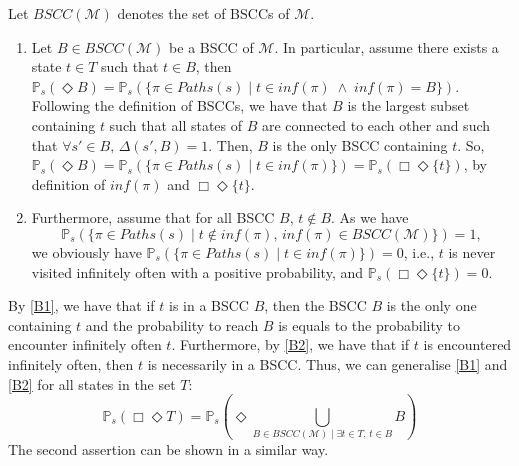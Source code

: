 \begin{proof2}
Let $BSCC(\mathcal{M})$ denotes the set of BSCCs of $\mathcal{M}$.
\begin{enumerate}
\item
Let $B \in BSCC(\mathcal{M})$ be a BSCC of $\mathcal{M}$.
In particular, assume there exists a state $t \in T$ such that $t \in B$, then $\mathbb{P}_s(\Diamond B) = \mathbb{P}_s(\{ \pi \in Paths(s) \; | \; t \in inf(\pi) \; \wedge \; inf(\pi) = B \})$. Following the definition of BSCCs, we have that $B$ is the largest subset containing $t$ such that all states of $B$ are connected to each other and such that $\forall s' \in B, \, \Delta(s', B)=1$. Then, $B$ is the only BSCC containing $t$. So,
$\mathbb{P}_s(\Diamond B) = \mathbb{P}_s(\{ \pi \in Paths(s) \; | \; t \in inf(\pi)\}) = \mathbb{P}_s(\Box \Diamond \{t\})$,
by definition of $inf(\pi)$ and $\Box\Diamond \{t\}$.
\label{B1}
\item
Furthermore, assume that for all BSCC $B$, $t \notin B$. As we have \[\mathbb{P}_s(\{\pi \in Paths(s)\; | \; t \notin inf(\pi), \, inf(\pi) \in BSCC(\mathcal{M})\}) = 1,\]
we obviously have $\mathbb{P}_s(\{\pi \in Paths(s)\; | \; t \in inf(\pi)\}) = 0$, i.e., $t$ is never visited infinitely often with a positive probability, and $\mathbb{P}_s(\Box\Diamond \{t\}) = 0$.
\label{B2}
\end{enumerate}
By \ref{B1}, we have that if $t$ is in a BSCC $B$, then the BSCC $B$ is the only one containing $t$ and the probability to reach $B$ is equals to the probability to encounter infinitely often $t$. Furthermore, by \ref{B2}, we have that if $t$ is encountered infinitely often, then $t$ is necessarily in a BSCC. Thus,
we can generalise \ref{B1} and \ref{B2} for all states in the set $T$:
\[\mathbb{P}_s(\Box \Diamond T) = \mathbb{P}_s(\Diamond \bigcup_{B \in BSCC(\mathcal{M}) \; | \; \exists t \in T, \, t \in B } B)\]
The second assertion can be shown in a similar way.
\end{proof2}\\

